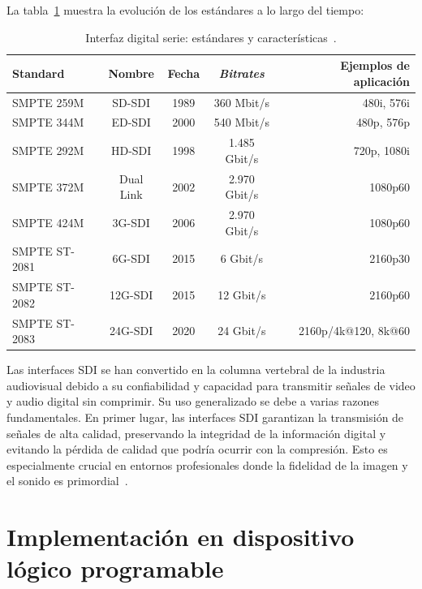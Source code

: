   La tabla~\ref{tab:sdi_standards} muestra la evolución de los estándares a lo
  largo del tiempo:

  \begin{table}[h]
      \caption{Interfaz digital serie: estándares y características~\citep{castr}.}\label{tab:sdi_standards}
      \centering
      \begin{tabular}{lcccr}
          \toprule
          \textbf{Standard} & \textbf{Nombre} & \textbf{Fecha} & \textbf{\textit{Bitrates}} & \textbf{Ejemplos de aplicación} \\
          \midrule
          SMPTE 259M      & SD-SDI    & 1989 & 360 Mbit/s     & 480i, 576i \\
          SMPTE 344M      & ED-SDI    & 2000 & 540 Mbit/s     & 480p, 576p \\
          SMPTE 292M      & HD-SDI    & 1998 & 1.485 Gbit/s   & 720p, 1080i \\
          SMPTE 372M      & Dual Link & 2002 & 2.970 Gbit/s   & 1080p60 \\
          SMPTE 424M      & 3G-SDI    & 2006 & 2.970 Gbit/s   & 1080p60 \\
          SMPTE ST-2081   & 6G-SDI    & 2015 & 6 Gbit/s       & 2160p30 \\
          SMPTE ST-2082   & 12G-SDI   & 2015 & 12 Gbit/s      & 2160p60 \\
          SMPTE ST-2083   & 24G-SDI   & 2020 & 24 Gbit/s      & 2160p/4k@120, 8k@60 \\
          \bottomrule
      \end{tabular}
  \end{table}

  Las interfaces SDI se han convertido en la columna vertebral de la industria
  audiovisual debido a su confiabilidad y capacidad para transmitir señales de
  video y audio digital sin comprimir. Su uso generalizado se debe a varias
  razones fundamentales. En primer lugar, las interfaces SDI garantizan la
  transmisión de señales de alta calidad, preservando la integridad de la
  información digital y evitando la pérdida de calidad que podría ocurrir con la
  compresión. Esto es especialmente crucial en entornos profesionales donde la
  fidelidad de la imagen y el sonido es primordial~\citep{castr}.

\section{Implementación en dispositivo lógico programable}

